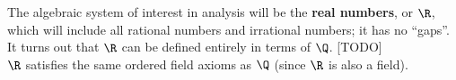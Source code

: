 \documentclass[math1010-lecture-notes]{subfiles}
\begin{document}
The algebraic system of interest in analysis will be the \textbf{real numbers}, or $\R$, which will
include all rational numbers and irrational numbers; it has no ``gaps''. It turns out that $\R$ can
be defined entirely in terms of $\Q$. [TODO]\\

$\R$ satisfies the same ordered field axioms as $\Q$ (since $\R$ is also a field).
\end{document}
